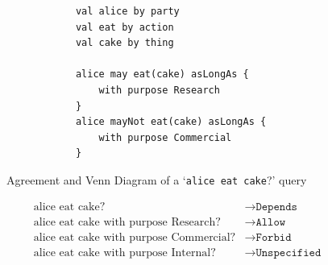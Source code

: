 \begin{figure}[h]
    \centering
    \begin{minipage}{0.5\textwidth}
        \begin{verbatim}
            val alice by party
            val eat by action
            val cake by thing

            alice may eat(cake) asLongAs {
                with purpose Research
            }
            alice mayNot eat(cake) asLongAs {
                with purpose Commercial
            }
        \end{verbatim}
    \end{minipage}

    \vspace{0.2cm}


    \caption{Agreement and Venn Diagram of a `\texttt{alice eat cake}?' query}
    \label{fig:allowance-venn}
\end{figure}

\begin{align}
    \label{eq:allowance-cake-example}
    \text{alice eat cake?} &\to \texttt{Depends}\\
    \text{alice eat cake with purpose Research?} &\to \texttt{Allow}\\
    \text{alice eat cake with purpose Commercial?} &\to \texttt{Forbid}\\
    \text{alice eat cake with purpose Internal?} &\to \texttt{Unspecified}
\end{align}



